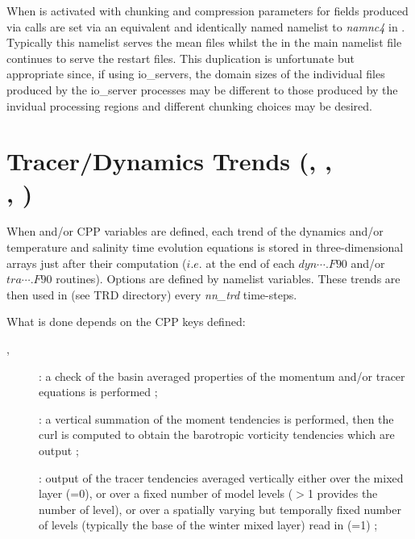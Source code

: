 When  is activated with  chunking and
compression parameters for fields produced via  calls are
set via an equivalent and identically named namelist to \textit{namnc4} 
in . Typically this namelist serves the mean files
whilst the  in the main namelist file continues to serve the
restart files. This duplication is unfortunate but appropriate since, if
using io\_servers, the domain sizes of the individual files produced by the
io\_server processes may be different to those produced by the invidual
processing regions and different chunking choices may be desired.
 

\section[Tracer/Dynamics Trends (TRD)]
                  {Tracer/Dynamics Trends  (, ,    \\ 
                                                             , )}
\label{DIA_trd}


When  and/or  CPP variables are defined, each 
trend of the dynamics and/or temperature and salinity time evolution equations 
is stored in three-dimensional arrays just after their computation ($i.e.$ at the end 
of each $dyn\cdots.F90$ and/or $tra\cdots.F90$ routines). Options are defined by
 namelist variables. These trends are then 
used in  (see TRD directory) every \textit{nn\_trd } time-steps.

What is done depends on the CPP keys defined:
\begin{description}
\item[, ] : a check of the basin averaged properties of the momentum 
and/or tracer equations is performed ; 
\item[] : a vertical summation of the moment tendencies is performed, 
then the curl is computed to obtain the barotropic vorticity tendencies which are output ;
\item[] : output of the tracer tendencies averaged vertically  
either over the mixed layer (=0), 
or       over a fixed number of model levels ($>$1 provides the number of level), 
or       over a spatially varying but temporally fixed number of levels (typically the base 
of the winter mixed layer) read in  (=1) ;
\end{description}

